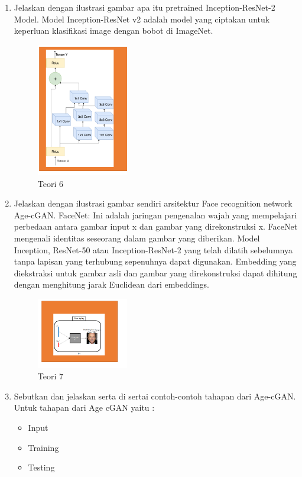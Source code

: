 \begin{enumerate}
	\item Jelaskan dengan ilustrasi gambar apa itu pretrained Inception-ResNet-2 Model.
	\hfill\break
	Model Inception-ResNet v2 adalah model yang ciptakan untuk keperluan klasifikasi image dengan bobot di ImageNet.
	\begin{figure}[H]
		\includegraphics[width=4cm]{figures/1164013/9/teori6.png}
		\centering
		\caption{Teori 6}
	\end{figure}

	\item Jelaskan dengan ilustrasi gambar sendiri arsitektur Face recognition network Age-cGAN.
	\hfill\break
	FaceNet: Ini adalah jaringan pengenalan wajah yang mempelajari perbedaan antara gambar input x dan gambar yang direkonstruksi x. FaceNet mengenali identitas seseorang dalam gambar yang diberikan. Model Inception, ResNet-50 atau Inception-ResNet-2 yang telah dilatih sebelumnya tanpa lapisan yang terhubung sepenuhnya dapat digunakan. Embedding yang diekstraksi untuk gambar asli dan gambar yang direkonstruksi dapat dihitung dengan menghitung jarak Euclidean dari embeddings.
	\begin{figure}[H]
		\includegraphics[width=4cm]{figures/1164013/9/teori7.png}
		\centering
		\caption{Teori 7}
	\end{figure}

	\item Sebutkan dan jelaskan serta di sertai contoh-contoh tahapan dari Age-cGAN.
	\hfill\break
	Untuk tahapan dari Age cGAN yaitu :
	\begin{itemize}
		\item Input
		\item Training
		\item Testing
	\end{itemize}


\end{enumerate}
